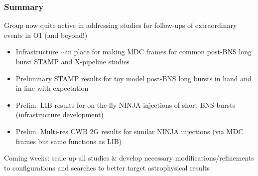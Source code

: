 \documentclass{beamer}
\begin{document}
\begin{frame}
    \frametitle{Summary}
    {\small 
    Group now quite active in addressing studies for follow-ups of extraordinary
    events in O1 (and beyond!)
    \begin{itemize}
        \item Infrastructure $\sim$in place for making MDC frames
            for common post-BNS long burst STAMP and X-pipeline studies
        \item Preliminary STAMP results for toy model post-BNS long bursts in
            hand and in line with expectation
        \item Prelim. LIB results for on-the-fly NINJA injections of short
            BNS bursts (infrastructure development)
        \item Prelim. Multi-res CWB 2G results for similar NINJA injections (via
            MDC frames but same functions as LIB)
    \end{itemize}
    Coming weeks: scale up all studies \& develop necessary
    modifications/refinements to configurations and searches to better target
    astrophysical results
}

\end{frame}
\end{document}
